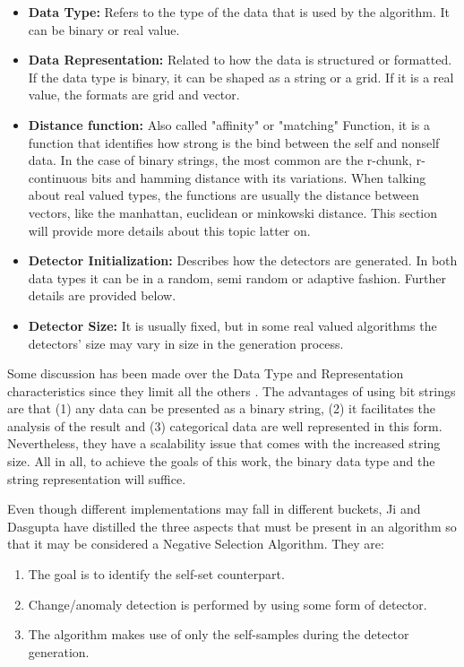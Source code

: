 \begin{itemize}
    \item \textbf{Data Type:} Refers to the type of the data that is used by the algorithm. It can be binary or real value.
    
    \item \textbf{Data Representation:} Related to how the data is structured or formatted. If the data type is binary, it can be shaped as a string or a grid. If it is a real value, the formats are grid and vector. 
    
    \item \textbf{Distance function:} Also called "affinity" or "matching" Function, it is a function that identifies how strong is the bind between the self and nonself data. In the case of binary strings, the most common are the r-chunk, r-continuous bits and hamming distance with its variations. When talking about real valued types, the functions are usually the distance between vectors, like the manhattan, euclidean or minkowski distance. This section will provide more details about this topic latter on.
    
    \item \textbf{Detector Initialization:} Describes how the detectors are generated. In both data types it can be in a random, semi random or adaptive fashion. Further details are provided below.
    
    \item \textbf{Detector Size:} It is usually fixed, but in some real valued algorithms the detectors' size may vary in size in the generation process.
    
\end{itemize}

Some discussion has been made over the Data Type and Representation characteristics since they limit all the others \cite{RevisitingNSA2007} \cite{NSAResearch2021} \cite{ICBook2009}. The advantages of using bit strings are that (1) any data can be presented as a binary string, (2) it facilitates the analysis of the result and (3) categorical data are well represented in this form. Nevertheless, they have a scalability issue that comes with the increased string size. All in all, to achieve the goals of this work, the binary data type and the string representation will suffice.

Even though different implementations may fall in different buckets, Ji and Dasgupta \cite{RevisitingNSA2007} have distilled the three aspects that must be present in an algorithm so that it may be considered a Negative Selection Algorithm. They are:
\begin{enumerate}
    \item The goal is to identify the self-set counterpart.
    \item Change/anomaly detection is performed by using some form of detector. 
    \item The algorithm makes use of only the self-samples during the detector generation.
  \end{enumerate}


